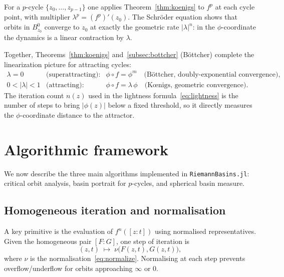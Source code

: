 \documentclass[12pt]{article}
\theoremstyle{definition}
\newcommand{\hpair}{[F:G]}
\begin{document}
For a $p$-cycle $\{z_0,\ldots,z_{p-1}\}$ one applies Theorem~\ref{thm:koenigs}
to $f^p$ at each cycle point, with multiplier $\lambda^p=(f^p)'(z_0)$.
The Schröder equation shows that orbits in $B^0_{z_0}$ converge to $z_0$ at
exactly the geometric rate $|\lambda|^n$: in the $\phi$-coordinate the
dynamics is a linear contraction by $\lambda$.

Together, Theorems~\ref{thm:koenigs} and~\ref{subsec:bottcher} (Böttcher)
complete the linearization picture for attracting cycles:
\[
  \begin{array}{rll}
    \lambda=0 & \text{(superattracting):} & \phi\circ f = \phi^m
                \quad\text{(Böttcher, doubly-exponential convergence),}\\
    0<|\lambda|<1 & \text{(attracting):} & \phi\circ f = \lambda\,\phi
                \quad\text{(Kœnigs, geometric convergence).}
  \end{array}
\]
The iteration count $n(z)$ used in the lightness formula~\eqref{eq:lightness}
is the number of steps to bring $|\phi(z)|$ below a fixed threshold, so it
directly measures the $\phi$-coordinate distance to the attractor.

\section{Algorithmic framework}
\label{sec:algorithms}

We now describe the three main algorithms implemented in
\texttt{RiemannBasins.jl}: critical orbit analysis, basin portrait
for $p$-cycles, and spherical basin measure.

\subsection{Homogeneous iteration and normalisation}

A key primitive is the evaluation of $f^n([z:t])$ using normalised
representatives.  Given the homogeneous pair $\hpair$, one step of
iteration is
\begin{equation}\label{eq:iterate}
  (z,t)\;\longmapsto\;\nu\bigl(F(z,t),G(z,t)\bigr),
\end{equation}
where $\nu$ is the normalisation~\eqref{eq:normalize}.  Normalising at
each step prevents overflow/underflow for orbits approaching $\infty$
or $0$.
\end{document}
